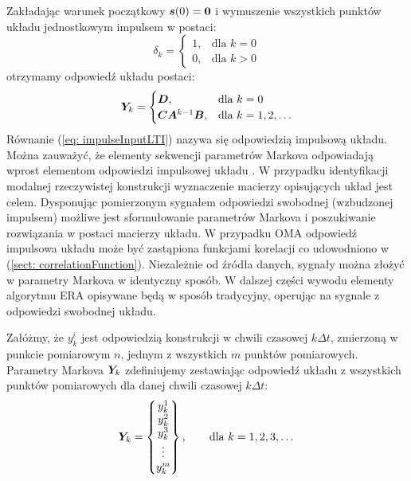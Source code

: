 Zakładając warunek początkowy $\bm{s}(0)=\bm{0}$ i wymuszenie wszystkich punktów układu jednostkowym impulsem w postaci:
\begin{equation}
	\delta_k = \begin{cases}
		1, & \text{dla }k=0 \\
		0, & \text{dla } k>0 
	\end{cases}
\end{equation}
otrzymamy odpowiedź układu postaci:
\begin{equation} \label{eq: impulseInputLTI}
	\bm{Y}_k= \begin{cases}
		\bm{D}, & \text{dla }k=0 \\
		\bm{C}\bm{A}^{k-1}\bm{B}, & \text{dla }k=1,2, \dots
	\end{cases}
\end{equation}
Równanie (\ref{eq: impulseInputLTI}) nazywa się odpowiedzią impulsową układu. Można zauważyć, że elementy sekwencji parametrów Markova odpowiadają wprost elementom odpowiedzi impulsowej układu \parencite{Phan1991}.
W przypadku identyfikacji modalnej rzeczywistej konstrukcji wyznaczenie macierzy opisujących układ jest celem. Dysponując pomierzonym sygnałem odpowiedzi swobodnej (wzbudzonej impulsem) możliwe jest sformułowanie parametrów Markova i poszukiwanie rozwiązania w postaci macierzy układu. W przypadku OMA odpowiedź impulsowa układu może być zastąpiona funkcjami korelacji co udowodniono w (\ref{sect: correlationFunction}).
Niezależnie od źródła danych, sygnały można złożyć w parametry Markova w identyczny sposób. W dalszej części wywodu elementy algorytmu ERA opisywane będą w sposób tradycyjny, operując na sygnale z odpowiedzi swobodnej układu. 

Załóżmy, że $y_k^i$ jest odpowiedzią konstrukcji w chwili czasowej $k\Delta t$, zmierzoną w punkcie pomiarowym $n$, jednym z wszystkich $m$ punktów pomiarowych. Parametry Markova $\bm{Y}_k$ zdefiniujemy zestawiając odpowiedź układu z wszystkich punktów pomiarowych dla danej chwili czasowej $k\Delta t$:
\begin{equation}
	\bm{Y}_k = \begin{Bmatrix}
		y_k^1 \\ y_k^2 \\ y_k^3 \\ \vdots \\ y_k^m 
	\end{Bmatrix},
	\qquad \text{dla } k=1,2,3,\dots
\end{equation}
